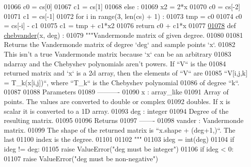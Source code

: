 \begin{DoxyCode}
01066         c0 = cs[0]
01067         c1 = cs[1]
01068     \textcolor{keywordflow}{else} :
01069         x2 = 2*x
01070         c0 = cs[-2]
01071         c1 = cs[-1]
01072         \textcolor{keywordflow}{for} i \textcolor{keywordflow}{in} range(3, len(cs) + 1) :
01073             tmp = c0
01074             c0 = cs[-i] - c1
01075             c1 = tmp + c1*x2
01076     \textcolor{keywordflow}{return} c0 + c1*x
01077 
\hypertarget{chebyshev_8py_source_l01078}{}\hyperlink{namespacepyneb_1_1utils_1_1chebyshev_aa9deae857486c8ee69362ded985b09d8}{01078} \textcolor{keyword}{def }\hyperlink{namespacepyneb_1_1utils_1_1chebyshev_aa9deae857486c8ee69362ded985b09d8}{chebvander}(x, deg) :
01079     \textcolor{stringliteral}{"""Vandermonde matrix of given degree.}
01080 \textcolor{stringliteral}{}
01081 \textcolor{stringliteral}{    Returns the Vandermonde matrix of degree `deg` and sample points `x`.}
01082 \textcolor{stringliteral}{    This isn't a true Vandermonde matrix because `x` can be an arbitrary}
01083 \textcolor{stringliteral}{    ndarray and the Chebyshev polynomials aren't powers. If ``V`` is the}
01084 \textcolor{stringliteral}{    returned matrix and `x` is a 2d array, then the elements of ``V`` are}
01085 \textcolor{stringliteral}{    ``V[i,j,k] = T\_k(x[i,j])``, where ``T\_k`` is the Chebyshev polynomial}
01086 \textcolor{stringliteral}{    of degree ``k``.}
01087 \textcolor{stringliteral}{}
01088 \textcolor{stringliteral}{    Parameters}
01089 \textcolor{stringliteral}{    ----------}
01090 \textcolor{stringliteral}{    x : array\_like}
01091 \textcolor{stringliteral}{        Array of points. The values are converted to double or complex}
01092 \textcolor{stringliteral}{        doubles. If x is scalar it is converted to a 1D array.}
01093 \textcolor{stringliteral}{    deg : integer}
01094 \textcolor{stringliteral}{        Degree of the resulting matrix.}
01095 \textcolor{stringliteral}{}
01096 \textcolor{stringliteral}{    Returns}
01097 \textcolor{stringliteral}{    -------}
01098 \textcolor{stringliteral}{    vander : Vandermonde matrix.}
01099 \textcolor{stringliteral}{        The shape of the returned matrix is ``x.shape + (deg+1,)``. The last}
01100 \textcolor{stringliteral}{        index is the degree.}
01101 \textcolor{stringliteral}{}
01102 \textcolor{stringliteral}{    """}
01103     ideg = int(deg)
01104     \textcolor{keywordflow}{if} ideg != deg:
01105         \textcolor{keywordflow}{raise} ValueError(\textcolor{stringliteral}{"deg must be integer"})
01106     \textcolor{keywordflow}{if} ideg < 0:
01107         \textcolor{keywordflow}{raise} ValueError(\textcolor{stringliteral}{"deg must be non-negative"})

\end{DoxyCode}
